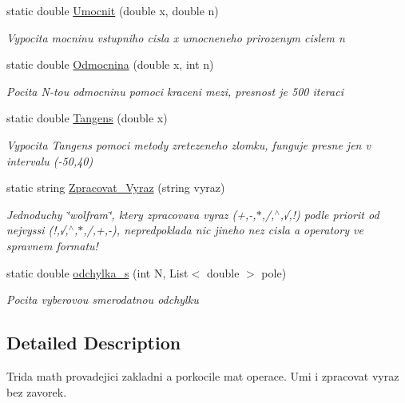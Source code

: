 \begin{DoxyCompactItemize}
static double \mbox{\hyperlink{class_math_library_1_1math_a4e4be4de44305ffd1bd15db33fb26e3a}{Umocnit}} (double x, double n)
\begin{DoxyCompactList}\small\item\em Vypocita mocninu vstupniho cisla x umocneneho prirozenym cislem n \end{DoxyCompactList}\item 
static double \mbox{\hyperlink{class_math_library_1_1math_aa28f90e3e657831aa9d634f1d0410413}{Odmocnina}} (double x, int n)
\begin{DoxyCompactList}\small\item\em Pocita N-\/tou odmocninu pomoci kraceni mezi, presnost je 500 iteraci \end{DoxyCompactList}\item 
static double \mbox{\hyperlink{class_math_library_1_1math_a389c42a9997236b24c2b0af1c43c625d}{Tangens}} (double x)
\begin{DoxyCompactList}\small\item\em Vypocita Tangens pomoci metody zretezeneho zlomku, funguje presne jen v intervalu (-\/50,40) \end{DoxyCompactList}\item 
static string \mbox{\hyperlink{class_math_library_1_1math_a4f3512b2dcb484d8b579274c5813f706}{Zpracovat\+\_\+\+Vyraz}} (string vyraz)
\begin{DoxyCompactList}\small\item\em Jednoduchy \char`\"{}wolfram\char`\"{}, ktery zpracovava vyraz (+,-\/,$\ast$,/,$^\wedge$,√,!) podle priorit od nejvyssi (!,√,$^\wedge$,$\ast$,/,+,-\/), nepredpoklada nic jineho nez cisla a operatory ve spravnem formatu! \end{DoxyCompactList}\item 
static double \mbox{\hyperlink{class_math_library_1_1math_a95a9b98b570e2f0ba44042550d9480c1}{odchylka\+\_\+s}} (int N, List$<$ double $>$ pole)
\begin{DoxyCompactList}\small\item\em Pocita vyberovou smerodatnou odchylku \end{DoxyCompactList}\end{DoxyCompactItemize}


\subsection{Detailed Description}
Trida math provadejici zakladni a porkocile mat operace. Umi i zpracovat vyraz bez zavorek. 



